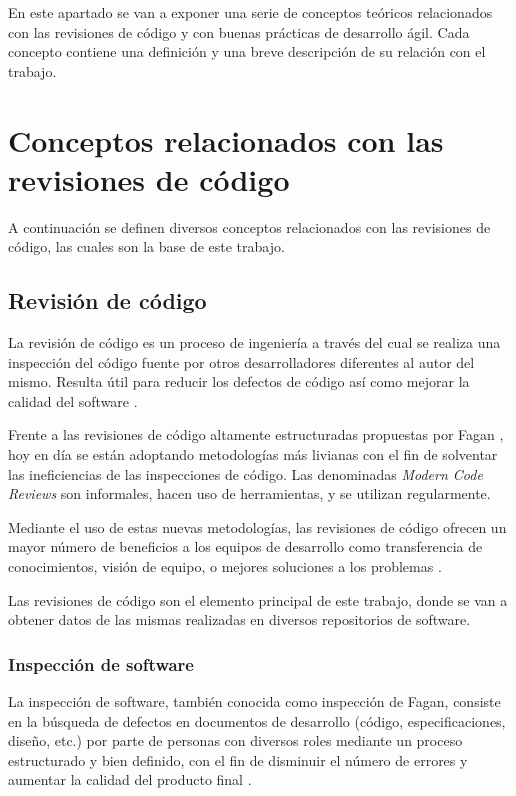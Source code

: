 
En este apartado se van a exponer una serie de conceptos teóricos relacionados con las revisiones de código y con buenas prácticas de desarrollo ágil. Cada concepto contiene una definición y una breve descripción de su relación con el trabajo.

\section{Conceptos relacionados con las revisiones de código}

A continuación se definen diversos conceptos relacionados con las revisiones de código, las cuales son la base de este trabajo.

\subsection{Revisión de código}
La revisión de código es un proceso de ingeniería a través del cual se realiza una inspección del código fuente por otros desarrolladores diferentes al autor del mismo. Resulta útil para reducir los defectos de código así como mejorar la calidad del software \cite{28121}.

Frente a las revisiones de código altamente estructuradas propuestas por Fagan \cite{5388086}, hoy en día se están adoptando metodologías más livianas con el fin de solventar las ineficiencias de las inspecciones de código. Las denominadas \textit{Modern Code Reviews} son informales, hacen uso de herramientas, y se utilizan regularmente.

Mediante el uso de estas nuevas metodologías, las revisiones de código ofrecen un mayor número de beneficios a los equipos de desarrollo como transferencia de conocimientos, visión de equipo, o mejores soluciones a los problemas \cite{Bacchelli:2013:EOC:2486788.2486882}.

Las revisiones de código son el elemento principal de este trabajo, donde se van a obtener datos de las mismas realizadas en diversos repositorios de software.

\subsubsection{Inspección de software}
La inspección de software, también conocida como inspección de Fagan, consiste en la búsqueda de defectos en documentos de desarrollo (código, especificaciones, diseño, etc.) por parte de personas con diversos roles mediante un proceso estructurado y bien definido, con el fin de disminuir el número de errores y aumentar la calidad del producto final \cite{5388086}.

